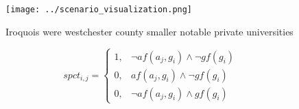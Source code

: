 \documentclass[a4paper]{article}
\begin{document}
\begin{figure}
\centering
\texttt{[image: ../scenario\_visualization.png]}
\caption{Iroquois were westchester county smaller notable private universities
}
\end{figure}
 
\begin{equation}
spct_{i,j} =
\begin{cases}
1, & \text{$\neg af(a_j,g_i) \wedge \neg gf(g_i)$}\\
0, & \text{$af(a_j,g_i) \wedge \neg gf(g_i)$}\\
0, & \text{$\neg af(a_j,g_i) \wedge gf(g_i)$}
\end{cases}
\end{equation}
\end{document}
